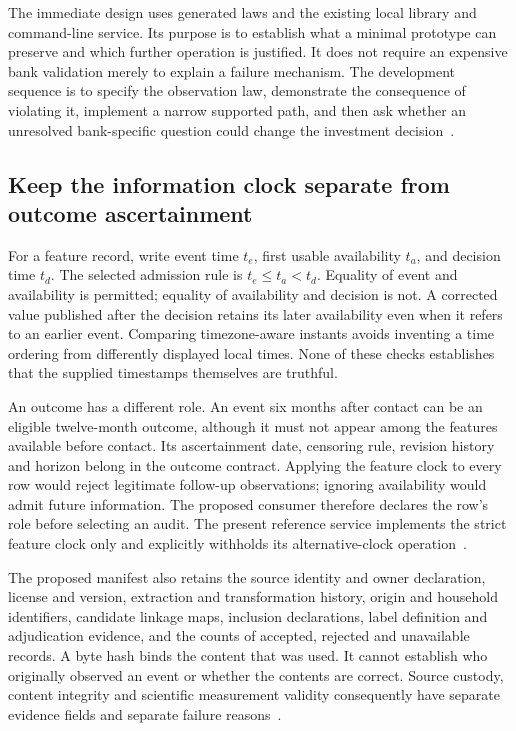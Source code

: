 The immediate design uses generated laws and the existing local library and
command-line service. Its purpose is to establish what a minimal prototype
can preserve and which further operation is justified. It does not require
an expensive bank validation merely to explain a failure mechanism. The
development sequence is to specify the observation law, demonstrate the
consequence of violating it, implement a narrow supported path, and then ask
whether an unresolved bank-specific question could change the investment
decision~\citep{exec13_observation_design}.

\subsection{Keep the information clock separate from outcome ascertainment}

For a feature record, write event time $t_e$, first usable availability
$t_a$, and decision time $t_d$. The selected admission rule is
$t_e\leq t_a<t_d$. Equality of event and availability is permitted; equality
of availability and decision is not. A corrected value published after the
decision retains its later availability even when it refers to an earlier
event. Comparing timezone-aware instants avoids inventing a time ordering
from differently displayed local times. None of these checks establishes
that the supplied timestamps themselves are truthful.

An outcome has a different role. An event six months after contact can be
an eligible twelve-month outcome, although it must not appear among the
features available before contact. Its ascertainment date, censoring rule,
revision history and horizon belong in the outcome contract. Applying the
feature clock to every row would reject legitimate follow-up observations;
ignoring availability would admit future information. The proposed consumer
therefore declares the row's role before selecting an audit. The present
reference service implements the strict feature clock only and explicitly
withholds its alternative-clock operation~\citep{exec13_observation_primary}.

The proposed manifest also retains the source identity and owner declaration,
license and version, extraction and transformation history, origin and
household identifiers, candidate linkage maps, inclusion declarations,
label definition and adjudication evidence, and the counts of accepted,
rejected and unavailable records. A byte hash binds the content that was
used. It cannot establish who originally observed an event or whether the
contents are correct. Source custody, content integrity and scientific
measurement validity consequently have separate evidence fields and separate
failure reasons~\citep{exec13_observation_design}.

